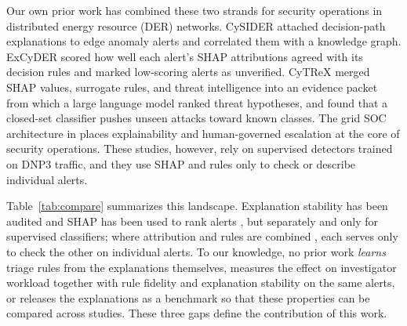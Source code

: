 \documentclass[journal]{IEEEtran}
\begin{document}
Our own prior work has combined these two strands for security operations in distributed energy resource (DER) networks. CySIDER \cite{cysider} attached decision-path explanations to edge anomaly alerts and correlated them with a knowledge graph. ExCyDER \cite{excyder} scored how well each alert's SHAP attributions agreed with its decision rules and marked low-scoring alerts as unverified. CyTReX \cite{cytrex} merged SHAP values, surrogate rules, and threat intelligence into an evidence packet from which a large language model ranked threat hypotheses, and found that a closed-set classifier pushes unseen attacks toward known classes. The grid SOC architecture in \cite{gridsoc} places explainability and human-governed escalation at the core of security operations. These studies, however, rely on supervised detectors trained on DNP3 traffic, and they use SHAP and rules only to check or describe individual alerts.

Table~\ref{tab:compare} summarizes this landscape. Explanation stability has been audited \cite{maseno,warnecke} and SHAP has been used to rank alerts \cite{gombar}, but separately and only for supervised classifiers; where attribution and rules are combined \cite{excyder,cytrex}, each serves only to check the other on individual alerts. To our knowledge, no prior work \emph{learns} triage rules from the explanations themselves, measures the effect on investigator workload together with rule fidelity and explanation stability on the same alerts, or releases the explanations as a benchmark so that these properties can be compared across studies. These three gaps define the contribution of this work.
\end{document}

